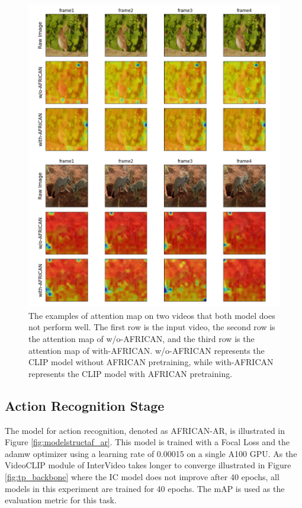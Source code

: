 \begin{figure}[ht]
    \centering
    \includegraphics[width=1.0\textwidth]{assets/charts/4_5_AttentionMaps_4}
    \caption[Attention Map 4 (Bad examples)]{The examples of attention map on two videos that both model does not perform well. The first row is the input video, the second row is the attention map of w/o-AFRICAN, and the third row is the attention map of with-AFRICAN. w/o-AFRICAN represents the CLIP model without AFRICAN pretraining, while with-AFRICAN represents the CLIP model with AFRICAN pretraining.}
    \label{fig:attnmap4}
\end{figure}




\subsection{Action Recognition Stage}
The model for action recognition, denoted as AFRICAN-AR, is illustrated in Figure \ref{fig:modelstructaf_ar}. This model is trained with a Focal Loss and the adamw optimizer using a learning rate of 0.00015 on a single A100 GPU. As the VideoCLIP module of InterVideo takes longer to converge illustrated in Figure \ref{fig:tp_backbone} where the IC model does not improve after 40 epochs, all models in this experiment are trained for 40 epochs. The mAP is used as the evaluation metric for this task.

